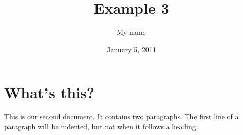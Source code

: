 \documentclass[a4paper,11pt]{article}
\begin{document}
 
\title{Example 3} 
\author{My name} 
\date{January 5, 2011} 
\maketitle 
\section{What's this?} 
This is our 
second document. 
It contains two paragraphs. The first line of a paragraph will be 
indented, but not when it follows a heading. 
\end{document}

